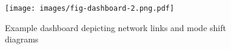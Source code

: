 \documentclass[3p,times,procedia]{elsarticle}
\begin{document}
\begin{figure}
  \centering
  \texttt{[image: images/fig-dashboard-2.png.pdf]}
  \caption{Example dashboard depicting network links and mode shift diagrams}
  \label{fig:chart2}
\end{figure}








\end{document}
